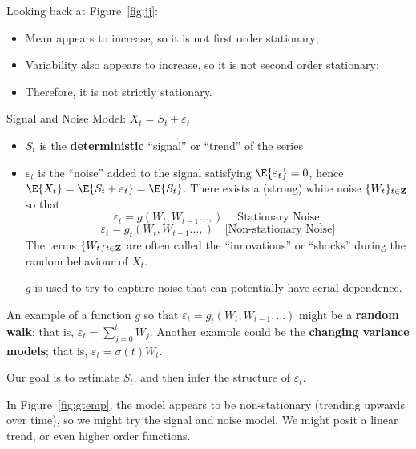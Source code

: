 Looking back at Figure~\ref{fig:jj}:
\begin{itemize}
    \item Mean appears to increase, so it is not first order stationary;
    \item Variability also appears to increase, so it is not
          second order stationary;
    \item Therefore, it is not strictly stationary.
\end{itemize}
Signal and Noise Model: $ X_t=S_t+\varepsilon_t $
\begin{itemize}
    \item $ S_t $ is the \textbf{deterministic}
          ``signal'' or ``trend'' of the series
    \item $ \varepsilon_t $ is the ``noise'' added
          to the signal satisfying $ \E{\varepsilon_t}=0 $, hence
          $ \E{X_t}=\E{S_t+\varepsilon_t}=\E{S_t} $.
          There exists a (strong) white noise $ \{W_t\}_{t\in\mathbf{Z}} $
          so that
          \[ \varepsilon_t=g(W_t,W_{t-1}\ldots,)\quad\text{[Stationary Noise]} \]
          \[ \varepsilon_t=g_t(W_t,W_{t-1}\ldots,)\quad\text{[Non-stationary Noise]} \]
          The terms $ \{W_t\}_{t\in\mathbf{Z}} $ are often called the
          ``innovations'' or ``shocks'' during the random behaviour
          of $ X_t $.

              {\color{blue}$ g $ is used to try to capture noise that can
                  potentially have serial dependence.}
\end{itemize}
\begin{Example}{}{}
    An example of a function $ g $ so that $ \varepsilon_t=g_t(W_t,W_{t-1},\ldots) $
    might be a \textbf{random walk}; that is, $ \varepsilon_t=\sum_{j=0}^{t} W_j $.
    Another example could be the \textbf{changing variance models}; that is,
    $ \varepsilon_t=\sigma(t)W_t $.
\end{Example}
Our goal is to estimate $ S_t $, and then infer the structure of $ \varepsilon_t $.

In Figure~\cref{fig:gtemp}, the model appears to be non-stationary
(trending upwards over time),
so we might try the signal and noise model. We might posit
a linear trend, or even higher order functions.


